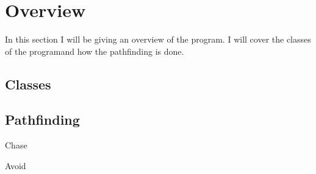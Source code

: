\section{Overview}
\label{03}

In this section I will be giving an overview of the program. I will cover the classes of the programand how the pathfinding is done.

\subsection{Classes}
\label{03_01}

\subsection{Pathfinding}
\label{03_02}

Chase

Avoid